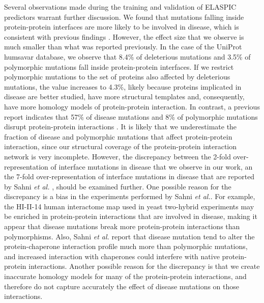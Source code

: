 Several observations made during the training and validation of ELASPIC predictors warrant further discussion. We found that mutations falling inside protein-protein interfaces are more likely to be involved in disease, which is consistent with previous findings \cite{sahni_widespread_2015}. However, the effect size that we observe is much smaller than what was reported previously. In the case of the UniProt humsavar database, we observe that 8.4\% of deleterious mutations and 3.5\% of polymorphic mutations fall inside protein-protein interfaces. If we restrict polymorphic mutations to the set of proteins also affected by deleterious mutations, the value increases to 4.3\%, likely because proteins implicated in disease are better studied, have more structural templates and, consequently, have more homology models of protein-protein interaction. In contrast, a previous report indicates that 57\% of disease mutations and 8\% of polymorphic mutations disrupt protein-protein interactions \cite{sahni_widespread_2015}. It is likely that we underestimate the fraction of disease and polymorphic mutations that affect protein-protein interaction, since our structural coverage of the protein-protein interaction network is very incomplete. However, the discrepancy between the 2-fold over-representation of interface mutations in disease that we observe in our work, an the 7-fold over-representation of interface mutations in disease that are reported by Sahni \textit{et al.} \cite{sahni_widespread_2015}, should be examined further. One possible reason for the discrepancy is a bias in the experiments performed by Sahni \textit{et al.}. For example, the HI-II-14 human interactome map used in yeast two-hybrid experiments may be enriched in protein-protein interactions that are involved in disease, making it appear that disease mutations break more protein-protein interactions than polymorphisms. Also, Sahni \textit{et al.} report that disease mutation tend to alter the protein-chaperone interaction profile much more than polymorphic mutations, and increased interaction with chaperones could interfere with native protein-protein interactions. Another possible reason for the discrepancy is that we create inaccurate homology models for many of the protein-protein interactions, and therefore do not capture accurately the effect of disease mutations on those interactions.

